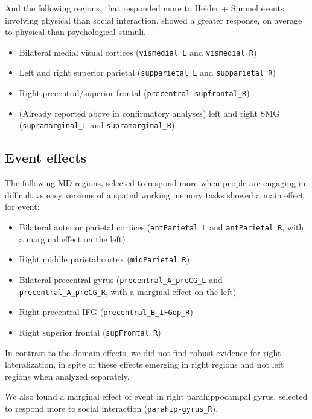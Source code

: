 \documentclass[
]{article}
\providecommand{\tightlist}{%
  \setlength{\itemsep}{0pt}\setlength{\parskip}{0pt}}
\begin{document}
And the following regions, that responded more to Heider + Simmel events
involving physical than social interaction, showed a greater response,
on average to physical than psychological stimuli.

\begin{itemize}
\tightlist
\item
  Bilateral medial visual cortices (\texttt{vismedial\_L} and
  \texttt{vismedial\_R})
\item
  Left and right superior parietal (\texttt{supparietal\_L} and
  \texttt{supparietal\_R})
\item
  Right precentral/superior frontal (\texttt{precentral-supfrontal\_R})
\item
  (Already reported above in confirmatory analyses) left and right SMG
  (\texttt{supramarginal\_L} and \texttt{supramarginal\_R})
\end{itemize}

\hypertarget{event-effects-1}{%
\subsection{Event effects}\label{event-effects-1}}

The following MD regions, selected to respond more when people are
engaging in difficult vs easy versions of a spatial working memory tasks
showed a main effect for event:

\begin{itemize}
\tightlist
\item
  Bilateral anterior parietal cortices (\texttt{antParietal\_L} and
  \texttt{antParietal\_R}, with a marginal effect on the left)
\item
  Right middle parietal cortex (\texttt{midParietal\_R})
\item
  Bilateral precentral gyrus (\texttt{precentral\_A\_preCG\_L} and
  \texttt{precentral\_A\_preCG\_R}, with a marginal effect on the left)
\item
  Right precentral IFG (\texttt{precentral\_B\_IFGop\_R})
\item
  Right superior frontal (\texttt{supFrontal\_R})
\end{itemize}

In contrast to the domain effects, we did not find robust evidence for
right lateralization, in spite of these effects emerging in right
regions and not left regions when analyzed separately.

We also found a marginal effect of event in right parahippocampal gyrus,
selected to respond more to social interaction
(\texttt{parahip-gyrus\_R}).
\end{document}
